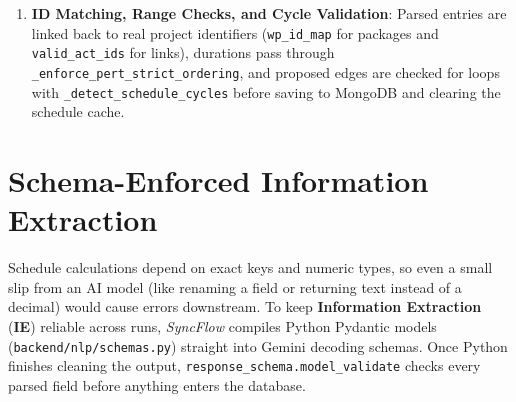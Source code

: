 \begin{enumerate}[leftmargin=2.3em,labelsep=0.6em,itemsep=1.5pt,topsep=1pt]
    \vspace{1mm}
    
    \item \textbf{ID Matching, Range Checks, and Cycle Validation}: Parsed entries are linked back to real project identifiers (\texttt{wp\_\allowbreak id\_\allowbreak map} for packages and \texttt{valid\_\allowbreak act\_\allowbreak ids} for links), durations pass through \texttt{\_enforce\_\allowbreak pert\_\allowbreak strict\_\allowbreak ordering}, and proposed edges are checked for loops with \texttt{\_detect\_\allowbreak schedule\_\allowbreak cycles} before saving to MongoDB and clearing the schedule cache.
\end{enumerate}

\vspace{4mm}

\section{Schema-Enforced Information Extraction}
Schedule calculations depend on exact keys and numeric types, so even a small slip from an AI model (like renaming a field or returning text instead of a decimal) would cause errors downstream. To keep \textbf{Information Extraction} (\textbf{IE}) reliable across runs, \textit{SyncFlow} compiles Python Pydantic models (\texttt{backend/\allowbreak nlp/\allowbreak schemas.py}) straight into Gemini decoding schemas. Once Python finishes cleaning the output, \texttt{response\_\allowbreak schema.\allowbreak model\_\allowbreak validate} checks every parsed field before anything enters the database.

\vspace{2mm}

